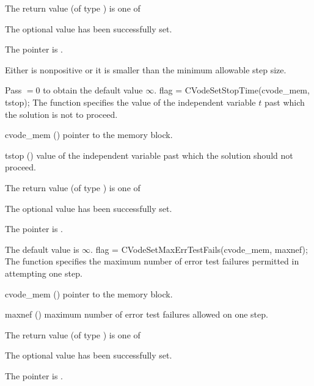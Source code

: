 {
  The return value  (of type ) is one of
  \begin{args}
  \item[\Id{CV\_SUCCESS}] 
    The optional value has been successfully set.
  \item[\Id{CV\_MEM\_NULL}]
    The  pointer is .
  \item[\Id{CV\_ILL\_INPUT}]
    Either  is nonpositive or it is smaller than the minimum allowable step size.
  \end{args}
}
{
  Pass $=0$ to obtain the default value $\infty$.
}
{
flag = CVodeSetStopTime(cvode\_mem, tstop);
}
{
  The function  specifies the value of the
  independent variable $t$ past which the solution is not to proceed.
}
{
  \begin{args}
  \item[cvode\_mem] ()
    pointer to the {\cvodes} memory block.
  \item[tstop] ()
    value of the independent variable past which the solution should
    not proceed.
  \end{args}
}
{
  The return value  (of type ) is one of
  \begin{args}
  \item[\Id{CV\_SUCCESS}] 
    The optional value has been successfully set.
  \item[\Id{CV\_MEM\_NULL}]
    The  pointer is .
  \end{args}
}
{
  The default value is $\infty$.
}
{
flag = CVodeSetMaxErrTestFails(cvode\_mem, maxnef);
}
{
  The function  specifies the
  maximum number of error test failures permitted in attempting one step.
}
{
  \begin{args}
  \item[cvode\_mem] ()
    pointer to the {\cvodes} memory block.
  \item[maxnef] ()
    maximum number of error test failures allowed on one step.
  \end{args}
}
{
  The return value  (of type ) is one of
  \begin{args}
  \item[\Id{CV\_SUCCESS}] 
    The optional value has been successfully set.
  \item[\Id{CV\_MEM\_NULL}]
    The  pointer is .
  \end{args}
}
